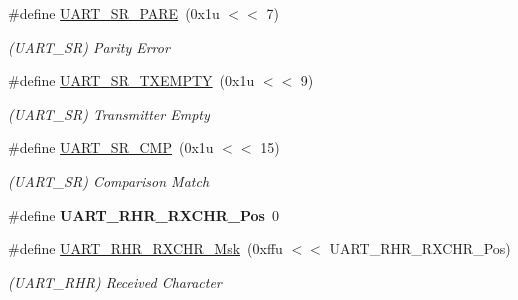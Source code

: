 \begin{DoxyCompactItemize}
\mbox{\label{group__SAMS70__UART_ga937c55851deda799bb2f2ee96e6fd81b}} 
\#define \mbox{\hyperlink{group__SAMS70__UART_ga937c55851deda799bb2f2ee96e6fd81b}{U\+A\+R\+T\+\_\+\+S\+R\+\_\+\+P\+A\+RE}}~(0x1u $<$$<$ 7)
\begin{DoxyCompactList}\small\item\em (U\+A\+R\+T\+\_\+\+SR) Parity Error \end{DoxyCompactList}\item 
\mbox{\label{group__SAMS70__UART_gab3c2d147ce2624a3f11c45d2051828af}} 
\#define \mbox{\hyperlink{group__SAMS70__UART_gab3c2d147ce2624a3f11c45d2051828af}{U\+A\+R\+T\+\_\+\+S\+R\+\_\+\+T\+X\+E\+M\+P\+TY}}~(0x1u $<$$<$ 9)
\begin{DoxyCompactList}\small\item\em (U\+A\+R\+T\+\_\+\+SR) Transmitter Empty \end{DoxyCompactList}\item 
\mbox{\label{group__SAMS70__UART_gae60bfce92b111f1320c0543fc83cbb48}} 
\#define \mbox{\hyperlink{group__SAMS70__UART_gae60bfce92b111f1320c0543fc83cbb48}{U\+A\+R\+T\+\_\+\+S\+R\+\_\+\+C\+MP}}~(0x1u $<$$<$ 15)
\begin{DoxyCompactList}\small\item\em (U\+A\+R\+T\+\_\+\+SR) Comparison Match \end{DoxyCompactList}\item 
\mbox{\label{group__SAMS70__UART_ga28f6c82f55b0652c7200494c2ab2b271}} 
\#define {\bfseries U\+A\+R\+T\+\_\+\+R\+H\+R\+\_\+\+R\+X\+C\+H\+R\+\_\+\+Pos}~0
\item 
\mbox{\label{group__SAMS70__UART_gaba17d1d8d32862be836e832b08b8a269}} 
\#define \mbox{\hyperlink{group__SAMS70__UART_gaba17d1d8d32862be836e832b08b8a269}{U\+A\+R\+T\+\_\+\+R\+H\+R\+\_\+\+R\+X\+C\+H\+R\+\_\+\+Msk}}~(0xffu $<$$<$ U\+A\+R\+T\+\_\+\+R\+H\+R\+\_\+\+R\+X\+C\+H\+R\+\_\+\+Pos)
\begin{DoxyCompactList}\small\item\em (U\+A\+R\+T\+\_\+\+R\+HR) Received Character \end{DoxyCompactList}\item 
\mbox{\label{group__SAMS70__UART_ga576a896cd32287d9b6c3b8d19a70b6f1}} 

\end{DoxyCompactItemize}
